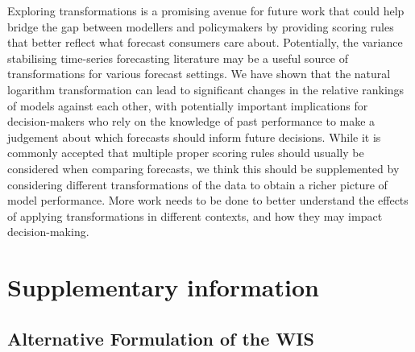 \documentclass{article}
\begin{document}
Exploring transformations is a promising avenue for future work that could help bridge the gap between modellers and policymakers by providing scoring rules that better reflect what forecast consumers care about. Potentially, the variance stabilising time-series forecasting literature may be a useful source of transformations for various forecast settings. We have shown that the natural logarithm transformation can lead to significant changes in the relative rankings of models against each other, with potentially important implications for decision-makers who rely on the knowledge of past performance to make a judgement about which forecasts should inform future decisions. While it is commonly accepted that multiple proper scoring rules should usually be considered when comparing forecasts, we think this should be supplemented by considering different transformations of the data to obtain a richer picture of model performance. More work needs to be done to better understand the effects of applying transformations in different contexts, and how they may impact decision-making. 

\newpage

\appendix
\section{Supplementary information}

\renewcommand{\thefigure}{SI.\arabic{figure}}
\setcounter{figure}{0}
\renewcommand{\thetable}{SI.\arabic{table}} \setcounter{table}{0}

\subsection{Alternative Formulation of the WIS}
\label{sec:alternative-wis}
\end{document}
